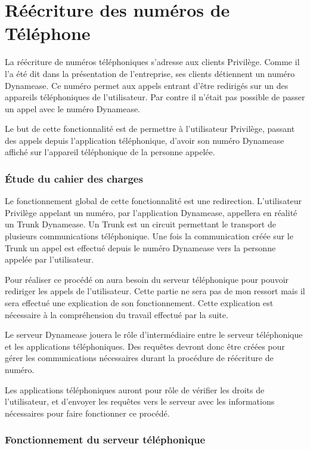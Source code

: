 \section{Réécriture des numéros de Téléphone}

La réécriture de numéros téléphoniques s'adresse aux clients Privilège. Comme il l'a été dit dans la présentation de l'entreprise, ses clients détiennent un numéro Dynamease. Ce numéro permet aux appels entrant d'être redirigés sur un des appareils téléphoniques de l'utilisateur. Par contre il n'était pas possible de passer un appel avec le numéro Dynamease.

Le but de cette fonctionnalité est de permettre à l'utilisateur Privilège, passant des appels depuis l'application téléphonique, d'avoir son numéro Dynamease affiché sur l'appareil téléphonique de la personne appelée.

\subsubsection{Étude du cahier des charges}

Le fonctionnement global de cette fonctionnalité est une redirection. L'utilisateur Privilège appelant un numéro, par l'application Dynamease, appellera en réalité un Trunk Dynamease. Un Trunk est un circuit permettant le transport de plusieurs communications téléphonique. Une fois la communication créée sur le Trunk un appel est effectué depuis le numéro Dynamease vers la personne appelée par l'utilisateur.

Pour réaliser ce procédé on aura besoin du serveur téléphonique pour pouvoir rediriger les appels de l'utilisateur. Cette partie ne sera pas de mon ressort mais il sera effectué une explication de son fonctionnement. Cette explication est nécessaire à la compréhension du travail effectué par la suite.

Le serveur Dynamease jouera le rôle d'intermédiaire entre le serveur téléphonique et les applications téléphoniques. Des requêtes devront donc être créées pour gérer les communications nécessaires durant la procédure de réécriture de numéro.

Les applications téléphoniques auront pour rôle de vérifier les droits de l'utilisateur, et d'envoyer les requêtes vers le serveur avec les informations nécessaires pour faire fonctionner ce procédé.

\subsubsection{Fonctionnement du serveur téléphonique}

